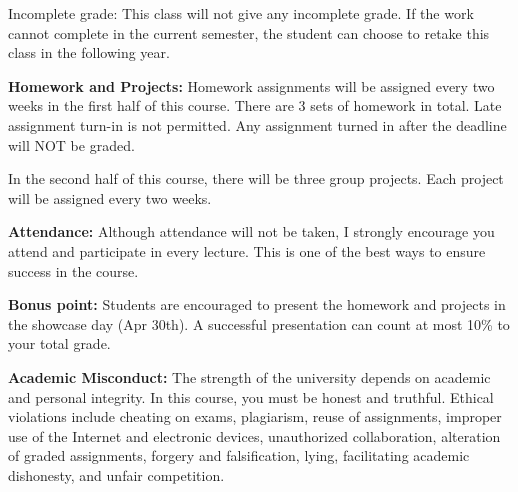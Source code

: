 \documentclass[a4paper,10pt]{article}
\begin{document}
Incomplete grade: This class will not give any
incomplete grade. If the work cannot complete in the
current semester, the student can choose to retake this
class in the following year.




\textbf{Homework and Projects:} Homework assignments will be assigned every two weeks in the first half of this course. There are 3 sets of homework in total. Late assignment turn-in is not permitted. Any assignment turned in after the deadline will NOT be graded. 

In the second half of this course, there will be three group projects. Each project will be assigned every two weeks.  




\textbf{Attendance:} Although attendance will not be taken, I strongly encourage you attend and participate in every lecture. This is one of the best ways to ensure success in the course.

\textbf{Bonus point:} Students are encouraged to present the homework and projects in the showcase day (Apr 30th). A successful presentation can count at most 10\% to your total grade.


\textbf{Academic Misconduct:} The strength of the university depends on academic and personal integrity. In this course, you must be honest 
and truthful. Ethical violations include cheating on exams, plagiarism, reuse of assignments, improper use 
of the Internet and electronic devices, unauthorized collaboration, alteration of graded assignments, forgery 
and falsification, lying, facilitating academic dishonesty, and unfair competition.
\end{document}
